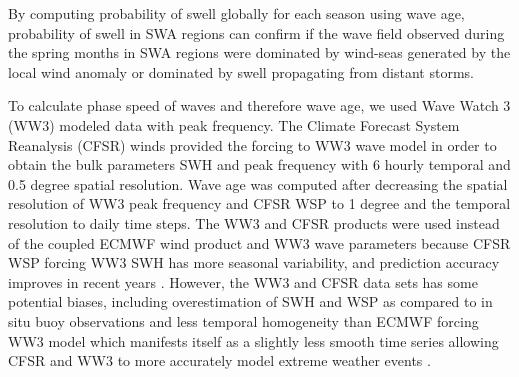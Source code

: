 \documentclass[12pt,twoside]{article}
\begin{document}
By computing probability of swell globally for each season using wave age, probability of swell in SWA regions can confirm if the wave field observed during the spring months in SWA regions were dominated by wind-seas generated by the local wind anomaly or dominated by swell propagating from distant storms.  

To calculate phase speed of waves and therefore wave age, we used Wave Watch 3 (WW3) modeled data with peak frequency. The Climate Forecast System Reanalysis (CFSR) winds provided the forcing to WW3 wave model in order to obtain the bulk parameters SWH and peak frequency with 6 hourly temporal and 0.5 degree spatial resolution. Wave age was computed after decreasing the spatial resolution of WW3 peak frequency and CFSR WSP to 1 degree and the temporal resolution to daily time steps. The WW3 and CFSR products were used instead of the coupled ECMWF wind product and WW3 wave parameters because CFSR WSP forcing WW3 SWH has more seasonal variability, and prediction accuracy improves in recent years \cite{stopa2014intercomparison}. However, the WW3 and CFSR data sets has some potential biases, including overestimation of SWH and WSP as compared to in situ buoy observations and less temporal homogeneity than ECMWF forcing WW3 model which manifests itself as a slightly less smooth time series allowing CFSR and WW3 to more accurately model extreme weather events \cite{stopa2014intercomparison}.  

\end{document}
